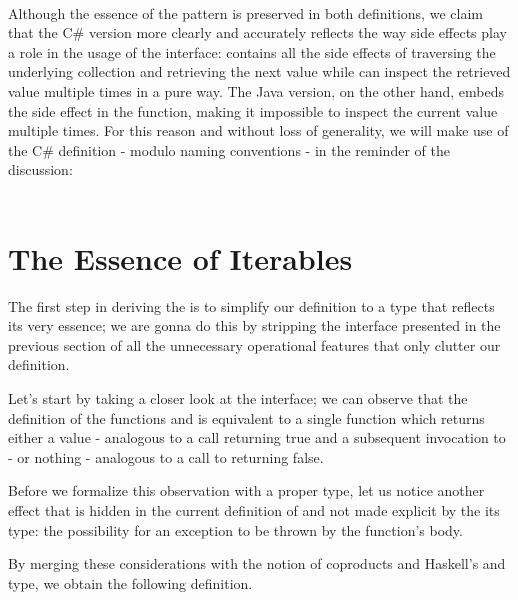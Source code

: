 \\

Although the essence of the pattern is preserved in both definitions, we claim that the C\# version more clearly and accurately reflects the way side effects play a role in the usage of the interface:  contains all the side effects of traversing the underlying collection and retrieving the next value while  can inspect the retrieved value multiple times in a pure way. The Java version, on the other hand, embeds the side effect in the  function, making it impossible to inspect the current value multiple times. For this reason and without loss of generality, we will make use of the C\# definition - modulo naming conventions - in the reminder of the discussion:\\

\\

\section{The Essence of Iterables}

The first step in deriving the  is to simplify our  definition to a type that reflects its very essence; we are gonna do this by stripping the interface presented in the previous section of all the unnecessary operational features that only clutter our definition.

Let's start by taking a closer look at the  interface; we can observe that the definition of the functions  and  is equivalent to a single function which returns either a value - analogous to a  call returning true and a subsequent invocation to  - or nothing - analogous to a call to  returning false. 

Before we formalize this observation with a proper type, let us notice another effect that is hidden in the current definition of  and not made explicit by the its type: the possibility for an exception to be thrown by the function's body. 

By merging these considerations with the notion of coproducts and Haskell's  and  type, we obtain the following definition.\\

\\


